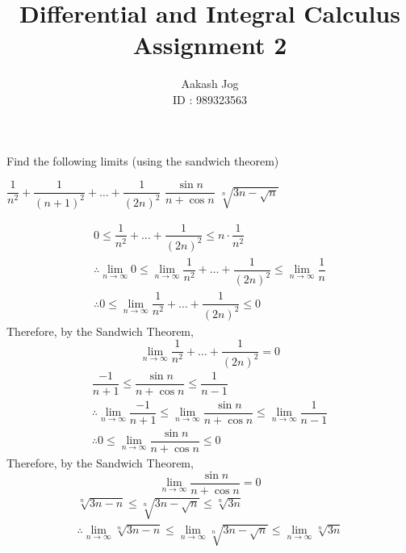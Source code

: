 \documentclass[fleqn, a4paper, 12pt, oneside]{amsart}
\title
{
	Differential and Integral Calculus\\
	Assignment 2
}
\author
{
	Aakash Jog\\
	ID : 989323563
}
\date{\formatdate{30}{3}{2015}}
\theoremstyle{definition}
\theoremstyle{theorem}
\begin{document}
	
\maketitle

\begin{question} %
	Find the following limits (using the sandwich theorem)
	\begin{tasks}
		\task $\dfrac{1}{n^2} + \dfrac{1}{(n + 1)^2} + \dots + \dfrac{1}{(2n)^2}$
		\task $\dfrac{\sin n}{n + \cos n}$
		\task $\sqrt[n]{3n - \sqrt{n}}$
	\end{tasks}
\end{question}

\begin{solution}
	\begin{tasks}
		\task
			\begin{gather*}
				0 \le \dfrac{1}{n^2} + \dots + \dfrac{1}{(2n)^2} \le n \cdot \dfrac{1}{n^2}\\
				\therefore \lim\limits_{n \to \infty} 0 \le \lim\limits_{n \to \infty} \dfrac{1}{n^2} + \dots + \dfrac{1}{(2n)^2} \le \lim\limits_{n \to \infty} \dfrac{1}{n}\\
				\therefore 0 \le \lim\limits_{n \to \infty} \dfrac{1}{n^2} + \dots + \dfrac{1}{(2n)^2} \le 0
			\end{gather*}
			Therefore, by the Sandwich Theorem,
			\begin{equation*}
				\lim\limits_{n \to \infty} \dfrac{1}{n^2} + \dots + \dfrac{1}{(2n)^2} = 0
			\end{equation*}
		\task
			\begin{gather*}
				\dfrac{-1}{n + 1} \le \dfrac{\sin n}{n + \cos n} \le \dfrac{1}{n - 1}\\
				\therefore \lim\limits_{n \to \infty} \dfrac{-1}{n + 1} \le \lim\limits_{n \to \infty} \dfrac{\sin n}{n + \cos n} \le \lim\limits_{n \to \infty} \dfrac{1}{n - 1}\\
				\therefore 0 \le \lim\limits_{n \to \infty} \dfrac{\sin n}{n + \cos n} \le 0
			\end{gather*}
			Therefore, by the Sandwich Theorem,
			\begin{equation*}
				\lim\limits_{n \to \infty}  \dfrac{\sin n}{n + \cos n} = 0
			\end{equation*}
		\task
			\begin{gather*}
				\sqrt[n]{3n - n} \le \sqrt[n]{3n - \sqrt{n}} \le \sqrt[n]{3n}\\
				\therefore \lim\limits_{n \to \infty} \sqrt[n]{3n - n} \le \lim\limits_{n \to \infty} \sqrt[n]{3n - \sqrt{n}} \le \lim\limits_{n \to \infty} \sqrt[n]{3n}\\

\end{gather*}
\end{tasks}
\end{solution}
\end{document}
